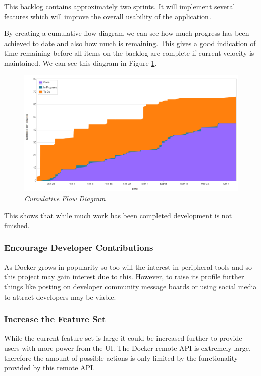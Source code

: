 This backlog contains approximately two sprints. It will implement several features which will improve the overall usability of the application. 

By creating a cumulative flow diagram we can see how much progress has been achieved to date and also how much is remaining. This gives a good indication of time remaining before all items on the backlog are complete if current velocity is maintained. We can see this diagram in Figure \ref{fig:cumulative_flow}.

\clearpage

\begin{figure}[!ht]
	\centering
	\includegraphics*[width=\textwidth]{images/cumulative_flow}
	\caption{\em Cumulative Flow Diagram}
	\label{fig:cumulative_flow}
\end{figure}

This shows that while much work has been completed development is not finished.

\subsubsection{Encourage Developer Contributions}
As Docker grows in popularity so too will the interest in peripheral tools and so this project may gain interest due to this. However, to raise its profile further things like posting on developer community message boards or using social media to attract developers may be viable.

\subsubsection{Increase the Feature Set}
While the current feature set is large it could be increased further to provide users with more power from the UI. The Docker remote API is extremely large, therefore the amount of possible actions is only limited by the functionality provided by this remote API.
